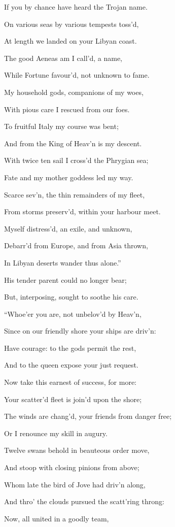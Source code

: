 If you by chance have heard the Trojan name.

On various seas by various tempests toss’d,

At length we landed on your Libyan coast.

The good Aeneas am I call’d, a name,

While Fortune favour’d, not unknown to fame.

My household gods, companions of my woes,

With pious care I rescued from our foes.

To fruitful Italy my course was bent;

And from the King of Heav’n is my descent.

With twice ten sail I cross’d the Phrygian sea;

Fate and my mother goddess led my way.

Scarce sev’n, the thin remainders of my fleet,

From storms preserv’d, within your harbour meet.

Myself distress’d, an exile, and unknown,

Debarr’d from Europe, and from Asia thrown,

In Libyan deserts wander thus alone.”

His tender parent could no longer bear;

But, interposing, sought to soothe his care.

“Whoe’er you are, not unbelov’d by Heav’n,

Since on our friendly shore your ships are driv’n:

Have courage: to the gods permit the rest,

And to the queen expose your just request.

Now take this earnest of success, for more:

Your scatter’d fleet is join’d upon the shore;

The winds are chang’d, your friends from danger free;

Or I renounce my skill in augury.

Twelve swans behold in beauteous order move,

And stoop with closing pinions from above;

Whom late the bird of Jove had driv’n along,

And thro’ the clouds pursued the scatt’ring throng:

Now, all united in a goodly team,

